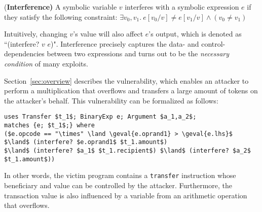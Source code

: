 \begin{definition}{{(\bf Interference)}}\label{def:interfere}
A symbolic variable $v$ interferes with a symbolic expression $e$ if they satisfy
the following constraint: $\exists v_0,v_1. \ e[v_0/v] \neq e[v_1/v] \land (v_0 \neq v_1)$
\end{definition}
\noindent Intuitively, changing $v$'s value will also affect $e$'s output,
which is denoted as ``(interfere? $v$ $e$)". Interference precisely captures 
the data- and control-dependencies between two expressions and turns out to be 
the \emph{necessary condition} of many exploits.

\medskip
Section~\ref{sec:overview} describes the \batchoverflow vulnerability, 
which enables an attacker to perform a multiplication that 
overflows and transfers a large amount of tokens on the attacker's behalf. 
This vulnerability can be formalized as follows:
\begin{vul}{{\bf \batchoverflow}}  
\begin{lstlisting}[numbers=none,morekeywords={uses,matches,where,interfere}]
uses Transfer $t_1$; BinaryExp e; Argument $a_1,a_2$;
matches {e; $t_1$;} where 
($e.opcode == "\times" \land \geval{e.oprand1} > \geval{e.lhs}$ 
$\land$ (interfere? $e.oprand1$ $t_1.amount$)
$\land$ (interfere? $a_1$ $t_1.recipient$) $\land$ (interfere? $a_2$ $t_1.amount$))
\end{lstlisting}
\end{vul}
\noindent In other words, the victim program contains a \texttt{transfer} instruction whose beneficiary and value 
can be  controlled by the attacker. Furthermore, the transaction value is also influenced by a variable 
from an arithmetic operation that overflows.

